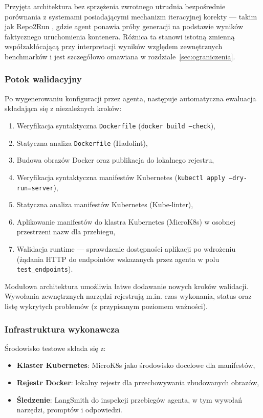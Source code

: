 Przyjęta architektura bez sprzężenia zwrotnego utrudnia bezpośrednie porównania z systemami posiadającymi mechanizm iteracyjnej korekty — takim jak Repo2Run \cite{hu_llm-based_2025}, gdzie agent ponawia próby generacji na podstawie wyników faktycznego uruchomienia kontenera. Różnica ta stanowi istotną zmienną współzakłócającą przy interpretacji wyników względem zewnętrznych benchmarków i jest szczegółowo omawiana w rozdziale~\ref{sec:ograniczenia}.

\subsubsection{Potok walidacyjny}

Po wygenerowaniu konfiguracji przez agenta, następuje automatyczna ewaluacja składająca się z niezależnych kroków:

\begin{enumerate}
    \item Weryfikacja syntaktyczna \texttt{Dockerfile} (\texttt{docker build --check}),
    \item Statyczna analiza \texttt{Dockerfile} (Hadolint),
    \item Budowa obrazów Docker oraz publikacja do lokalnego rejestru,
    \item Weryfikacja syntaktyczna manifestów Kubernetes (\texttt{kubectl apply --dry-run=server}),
    \item Statyczna analiza manifestów Kubernetes (Kube-linter),
    \item Aplikowanie manifestów do klastra Kubernetes (MicroK8s) w osobnej przestrzeni nazw dla przebiegu,
    \item Walidacja runtime — sprawdzenie dostępności aplikacji po wdrożeniu (żądania HTTP do endpointów wskazanych przez agenta w polu \texttt{test\_endpoints}).
\end{enumerate}

Modułowa architektura umożliwia łatwe dodawanie nowych kroków walidacji. Wywołania zewnętrznych narzędzi rejestrują m.in. czas wykonania, status oraz listę wykrytych problemów (z przypisanym poziomem ważności).

\subsubsection{Infrastruktura wykonawcza}

Środowisko testowe składa się z:
\begin{itemize}
    \item \textbf{Klaster Kubernetes}: MicroK8s jako środowisko docelowe dla manifestów,
    \item \textbf{Rejestr Docker}: lokalny rejestr dla przechowywania zbudowanych obrazów,
    \item \textbf{Śledzenie}: LangSmith do inspekcji przebiegów agenta, w tym wywołań narzędzi, promptów i odpowiedzi.
\end{itemize}

